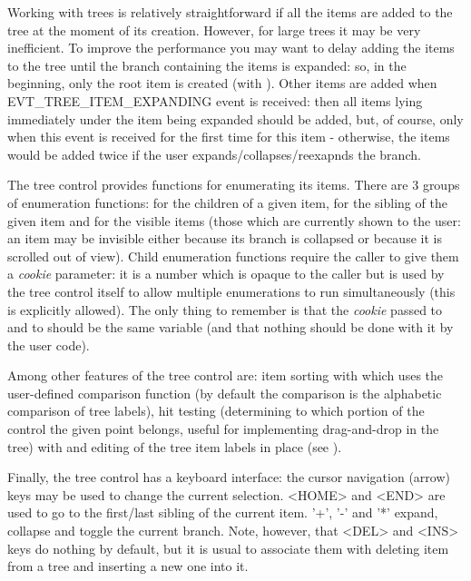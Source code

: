 Working with trees is relatively straightforward if all the items are added to
the tree at the moment of its creation. However, for large trees it may be
very inefficient. To improve the performance you may want to delay adding the
items to the tree until the branch containing the items is expanded: so, in the
beginning, only the root item is created (with 
). Other items are added when
EVT\_TREE\_ITEM\_EXPANDING event is received: then all items lying immediately
under the item being expanded should be added, but, of course, only when this
event is received for the first time for this item - otherwise, the items would
be added twice if the user expands/collapses/reexapnds the branch.

The tree control provides functions for enumerating its items. There are 3
groups of enumeration functions: for the children of a given item, for the
sibling of the given item and for the visible items (those which are currently
shown to the user: an item may be invisible either because its branch is
collapsed or because it is scrolled out of view). Child enumeration functions
require the caller to give them a {\it cookie} parameter: it is a number which
is opaque to the caller but is used by the tree control itself to allow
multiple enumerations to run simultaneously (this is explicitly allowed). The
only thing to remember is that the {\it cookie} passed to 
 and to 
 should be the same variable (and
that nothing should be done with it by the user code).

Among other features of the tree control are: item sorting with 
 which uses the user-defined comparison
function  (by default the
comparison is the alphabetic comparison of tree labels), hit testing
(determining to which portion of the control the given point belongs, useful
for implementing drag-and-drop in the tree) with 
 and editing of the tree item labels in
place (see ).

Finally, the tree control has a keyboard interface: the cursor navigation (arrow) keys
may be used to change the current selection. <HOME> and <END> are used to go to
the first/last sibling of the current item. '+', '-' and '*' expand, collapse
and toggle the current branch. Note, however, that <DEL> and <INS> keys do
nothing by default, but it is usual to associate them with deleting item from
a tree and inserting a new one into it.

